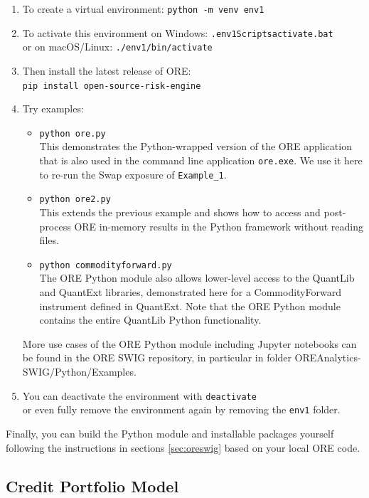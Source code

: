 \begin{enumerate}
\item To create a virtual environment: {\tt python -m venv env1}
\item To activate this environment on Windows: {\tt .{\bs}env1{\bs}Scripts{\bs}activate.bat}  \\
or on macOS/Linux: {\tt ./env1/bin/activate }
\item Then install the latest release of ORE:\\
{\tt pip install open-source-risk-engine }
\item Try examples:\\
	\begin{itemize}
	\item {\tt python ore.py} \\
	This demonstrates the Python-wrapped version of the ORE application that is also used in the command line application {\tt ore.exe}. We use it here to re-run the Swap exposure of {\tt Example\_1}.
	\item {\tt python ore2.py} \\
	This extends the previous example and shows how to access and post-process ORE in-memory results in the Python framework without reading files.
	\item {\tt python commodityforward.py} \\
	The ORE Python module also allows lower-level access to the QuantLib and QuantExt libraries, demonstrated here for a CommodityForward instrument defined in QuantExt.
	Note that the ORE Python module contains the entire QuantLib Python functionality.
	\end{itemize}
	More use cases of the ORE Python module including Jupyter notebooks can be found in the ORE SWIG repository, in particular in folder OREAnalytics-SWIG/Python/Examples.
\item You can deactivate the environment with {\tt deactivate} \\
or even fully remove the environment again by removing the {\tt env1} folder.
\end{enumerate}

Finally, you can build the Python module and installable packages yourself following the instructions in sections \ref{sec:oreswig} based on your local ORE code.

\subsection{Credit Portfolio Model}%
\label{example:43}

